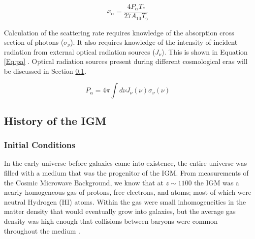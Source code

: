 \begin{equation}\label{Eq:xa}
x_{\alpha} = \frac{4 P_{\alpha} T_*}{27 A_{10} T_{\gamma}}
\end{equation}

Calculation of the scattering rate requires knowledge of the absorption cross section of photons ($\sigma_{\nu}$). It also requires knowledge of the intensity of incident radiation from external optical radiation sources ($J_{\nu}$). This is shown in Equation \ref{Eq:pa} \cite{furlanetto_2006}. Optical radiation sources present during different cosmological eras will be discussed in Section \ref{Sec:IGMhist}. 

\begin{equation}\label{Eq:pa}
P_{\alpha} = 4 \pi \int d\nu J_{\nu}(\nu) \sigma_{\nu}(\nu)
\end{equation}


\subsection{History of the IGM} \label{Sec:IGMhist}

\subsubsection{Initial Conditions}

In the early universe before galaxies came into existence, the entire universe was filled with a medium that was the progenitor of the IGM. From measurements of the Cosmic Microwave Background, we know that at $z \sim 1100$ the IGM was a nearly homogeneous gas of protons, free electrons, and atoms; most of which were neutral Hydrogen (HI) atoms. Within the gas were small inhomogeneities in the matter density that would eventually grow into galaxies, but the average gas density was high enough that collisions between baryons were common throughout the medium \cite{furlanetto_2006}. 

